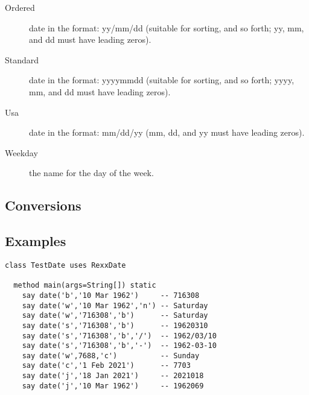 \begin{description}
\item[Ordered]
date in the format: yy/mm/dd (suitable for sorting, and so forth; yy, mm, and dd must have leading zeros).
\item[Standard]
date in the format: yyyymmdd (suitable for sorting, and so forth; yyyy, mm, and dd must have leading zeros).
\item[Usa]
date in the format: mm/dd/yy (mm, dd, and yy must have leading zeros).
\item[Weekday]
the name for the day of the week.
\end{description}

\subsection{Conversions}

\subsection{Examples}

\begin{lstlisting}[label=datessexample,caption=Example of using Date()]
  class TestDate uses RexxDate

  method main(args=String[]) static
    say date('b','10 Mar 1962')     -- 716308
    say date('w','10 Mar 1962','n') -- Saturday
    say date('w','716308','b')      -- Saturday
    say date('s','716308','b')      -- 19620310 
    say date('s','716308','b','/')  -- 1962/03/10
    say date('s','716308','b','-')  -- 1962-03-10
    say date('w',7688,'c')          -- Sunday
    say date('c','1 Feb 2021')      -- 7703
    say date('j','18 Jan 2021')     -- 2021018
    say date('j','10 Mar 1962')     -- 1962069
\end{lstlisting}

